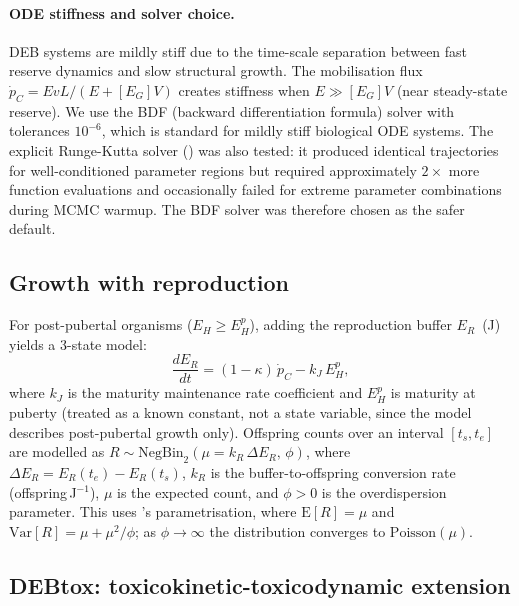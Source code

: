 \documentclass[article,shortnames]{jss}
\newcommand{\EG}{[E_G]}
\begin{document}
\paragraph{ODE stiffness and solver choice.}
DEB systems are mildly stiff due to the time-scale separation between
fast reserve dynamics and slow structural growth.  The mobilisation
flux $\dot{p}_C = EvL / (E + \EG V)$ creates stiffness when $E \gg
\EG V$ (near steady-state reserve).  We use the BDF (backward
differentiation formula) solver  with tolerances
$10^{-6}$, which is standard for mildly stiff biological ODE systems.
The explicit Runge-Kutta solver () was also tested:
it produced identical trajectories for well-conditioned parameter
regions but required approximately $2\times$ more function evaluations
and occasionally failed for extreme parameter combinations during MCMC
warmup.  The BDF solver was therefore chosen as the safer default.

\subsection{Growth with reproduction} \label{sec:repro}

For post-pubertal organisms ($E_H \geq E_H^p$), adding the
reproduction buffer $E_R$~(J) yields a 3-state model:
\begin{equation}
  \frac{dE_R}{dt} = (1 - \kappa) \, \dot{p}_C - k_J \, E_H^p,
    \label{eq:dR}
\end{equation}
where $k_J$ is the maturity maintenance rate coefficient and $E_H^p$
is maturity at puberty (treated as a known constant, not a state
variable, since the model describes post-pubertal growth only).  Offspring counts over an interval
$[t_s, t_e]$ are modelled as
$R \sim \mathrm{NegBin}_2(\mu = k_R \, \Delta E_R,\, \phi)$,
where $\Delta E_R = E_R(t_e) - E_R(t_s)$, $k_R$ is the buffer-to-offspring
conversion rate (offspring\,J$^{-1}$), $\mu$ is the expected count, and
$\phi > 0$ is the overdispersion parameter.  This uses 's
 parametrisation, where $\mathrm{E}[R] = \mu$
and $\mathrm{Var}[R] = \mu + \mu^2/\phi$; as
$\phi \to \infty$ the distribution converges to
$\mathrm{Poisson}(\mu)$.

\subsection{DEBtox: toxicokinetic-toxicodynamic extension}
\label{sec:debtox}
\end{document}
